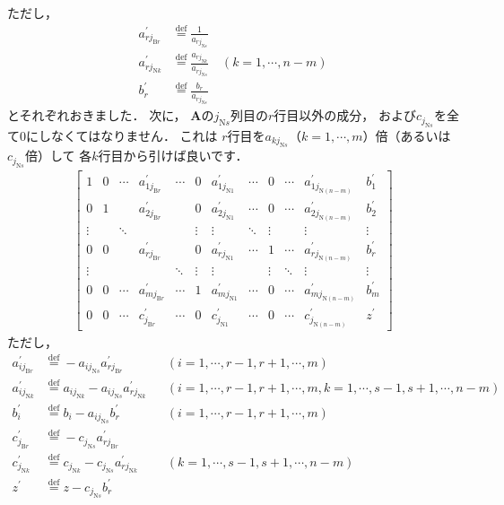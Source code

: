 ﻿\documentclass[a4paper]{jsarticle}
\begin{document}
ただし，
\begin{align*}
a_{rj_{\mathrm{B}r}}^{\prime}&\overset{\mathrm{def}}{=}\frac{1}{a_{rj_{\mathrm{N}s}}}
\\
a_{rj_{\mathrm{N}k}}^{\prime}&\overset{\mathrm{def}}{=}\frac{a_{rj_{\mathrm{N}k}}}{a_{rj_{\mathrm{N}s}}}
\quad(k=1,\cdots,n-m)
\\
b_{r}^{\prime}&\overset{\mathrm{def}}{=}\frac{b_{r}}{a_{rj_{\mathrm{N}s}}}
\end{align*}
とそれぞれおきました．
次に，
$\boldsymbol{A}$の$j_{\mathrm{N}s}$列目の$r$行目以外の成分，
および$c_{j_{\mathrm{N}s}}$を全て$0$にしなくてはなりません．
これは
$r$行目を$a_{kj_{\mathrm{N}s}}$（$k=1,\cdots,m$）倍（あるいは$c_{j_{\mathrm{N}s}}$倍）して
各$k$行目から引けば良いです．
\begin{align*}
\left[\begin{array}{cccccc|ccccc|c}
 1 & 0 & \cdots & a_{1j_{\mathrm{B}r}}^{\prime} & \cdots & 0 & a_{1j_{\mathrm{N}1}}^{\prime} & \cdots & 0 & \cdots & a_{1j_{\mathrm{N}(n-m)}}^{\prime} & b_{1}^{\prime} \\
 0 & 1 &        & a_{2j_{\mathrm{B}r}}^{\prime} &        & 0 & a_{2j_{\mathrm{N}1}}^{\prime} & \cdots & 0 & \cdots & a_{2j_{\mathrm{N}(n-m)}}^{\prime} & b_{2}^{\prime} \\
\vdots & & \ddots & & & \vdots & \vdots & \ddots &  \vdots & &  \vdots & \vdots \\
 0 & 0 &        & a_{rj_{\mathrm{B}r}}^{\prime} & & 0 & a_{rj_{\mathrm{N}1}}^{\prime} & \cdots & 1 & \cdots & a_{rj_{\mathrm{N}(n-m)}}^{\prime} & b_{r}^{\prime} \\
\vdots & & & & \ddots & \vdots & \vdots & &  \vdots & \ddots &  \vdots & \vdots \\
 0 & 0 & \cdots & a_{mj_{\mathrm{B}r}}^{\prime} & \cdots & 1 & a_{mj_{\mathrm{N}1}}^{\prime} & \cdots & 0 & \cdots & a_{mj_{\mathrm{N}(n-m)}}^{\prime} & b_{m}^{\prime} \\
\hline
 0 & 0 & \cdots & c_{j_{\mathrm{B}r}}^{\prime} & \cdots & 0 & c_{j_{\mathrm{N}1}}^{\prime} & \cdots & 0 & \cdots & c_{j_{\mathrm{N}(n-m)}}^{\prime} & z^{\prime}
\end{array}
\right]
\end{align*}
ただし，
\begin{align*}
a_{ij_{\mathrm{B}r}}^{\prime}&\overset{\mathrm{def}}{=}
-a_{ij_{\mathrm{N}s}}a_{rj_{\mathrm{B}r}}^{\prime}
& &(i=1,\cdots,r-1,r+1,\cdots,m)
\\
a_{ij_{\mathrm{N}k}}^{\prime}&\overset{\mathrm{def}}{=}
a_{ij_{\mathrm{N}k}}-a_{ij_{\mathrm{N}s}}a_{rj_{\mathrm{N}k}}^{\prime}
& &(i=1,\cdots,r-1,r+1,\cdots,m, k=1,\cdots,s-1,s+1,\cdots,n-m)
\\
b_{i}^{\prime}&\overset{\mathrm{def}}{=}
b_{i}-a_{ij_{\mathrm{N}s}}b_{r}^{\prime}
& &(i=1,\cdots,r-1,r+1,\cdots,m)
\\
c_{j_{\mathrm{B}r}}^{\prime}&\overset{\mathrm{def}}{=}
-c_{j_{\mathrm{N}s}}a_{rj_{\mathrm{B}r}}^{\prime}
& &
\\
c_{j_{\mathrm{N}k}}^{\prime}&\overset{\mathrm{def}}{=}
c_{j_{\mathrm{N}k}}-c_{j_{\mathrm{N}s}}a_{rj_{\mathrm{N}k}}^{\prime}
& &(k=1,\cdots,s-1,s+1,\cdots,n-m)
\\
z^{\prime}&\overset{\mathrm{def}}{=}
z-c_{j_{\mathrm{N}s}}b_{r}^{\prime}
& &
\end{align*}
\end{document}
